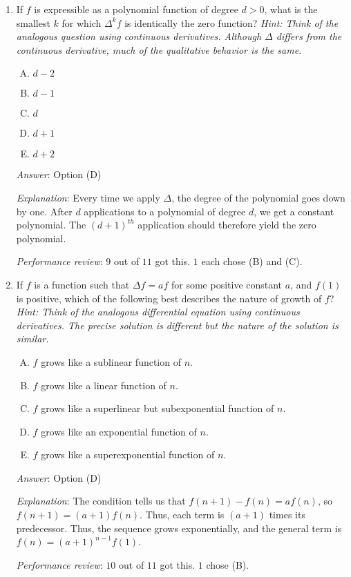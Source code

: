 \documentclass[10pt]{amsart}
\begin{document}
\begin{enumerate}
  {\em Answer}: Option (E)

  {\em Explanation}: We get $f(n + 1) - f(n) = (n + 1)^2 - n^2 = n^2 +
  2n + 1 - n^2 = 2n + 1$.

  {\em Performance review}: All $11$ people got this.

\item If $f$ is expressible as a polynomial function of degree $d >
  0$, what is the smallest $k$ for which $\Delta^k f$ is identically
  the zero function? {\em Hint: Think of the analogous question using
  continuous derivatives. Although $\Delta$ differs from the
  continuous derivative, much of the qualitative behavior is the same.}

  \begin{enumerate}[(A)]
  \item $d - 2$
  \item $d - 1$
  \item $d$
  \item $d + 1$
  \item $d + 2$
  \end{enumerate}

  {\em Answer}: Option (D)

  {\em Explanation}: Every time we apply $\Delta$, the degree of the
  polynomial goes down by one. After $d$ applications to a polynomial
  of degree $d$, we get a constant polynomial. The $(d + 1)^{th}$
  application should therefore yield the zero polynomial.

  {\em Performance review}: $9$ out of $11$ got this. $1$ each chose (B) and (C).

\item If $f$ is a function such that $\Delta f = af$ for some positive
  constant $a$, and $f(1)$ is positive, which of the following best
  describes the nature of growth of $f$? {\em Hint: Think of the
  analogous differential equation using continuous derivatives. The
  precise solution is different but the nature of the solution is
  similar.}

  \begin{enumerate}[(A)]
  \item $f$ grows like a sublinear function of $n$.
  \item $f$ grows like a linear function of $n$.
  \item $f$ grows like a superlinear but subexponential function of
    $n$.
  \item $f$ grows like an exponential function of $n$.
  \item $f$ grows like a superexponential function of $n$.
  \end{enumerate}

  {\em Answer}: Option (D)
  
  {\em Explanation}: The condition tells us that $f(n+1) - f(n) =
  af(n)$, so $f(n+1) = (a+1)f(n)$. Thus, each term is $(a + 1)$ times
  its predecessor. Thus, the sequence grows exponentially, and the
  general term is $f(n) = (a+1)^{n-1}f(1)$.

  {\em Performance review}: $10$ out of $11$ got this. $1$ chose (B).
\end{enumerate}
\end{document}
